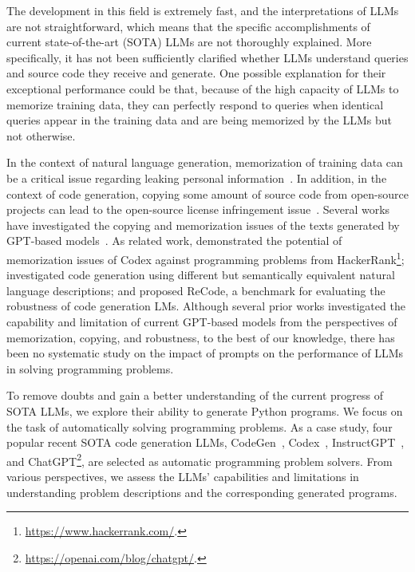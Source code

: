 \documentclass{article}
\begin{document}
The development in this field is extremely fast, and the interpretations of LLMs are not straightforward, which means that the specific accomplishments of current state-of-the-art (SOTA) LLMs are not thoroughly explained.
More specifically, it has not been sufficiently clarified whether LLMs understand queries and source code they receive and generate.
One possible explanation for their exceptional performance could be that, because of the high capacity of LLMs to memorize training data, they can perfectly respond to queries when identical queries appear in the training data and are being memorized by the LLMs but not otherwise.

In the context of natural language generation, memorization of training data can be a critical issue regarding leaking personal information~\citep{huang2022leaking}.
In addition, in the context of code generation, copying some amount of source code from open-source projects can lead to the open-source license infringement issue~\citep{ciniselli2022copy}.
Several works have investigated the copying and memorization issues of the texts generated by GPT-based models~\citep{carlini2021extract,elangovan2021memorization}.
As related work, \citet{karmakar2022hackerrank} demonstrated the potential of memorization issues of Codex against programming problems from HackerRank\footnote{\url{https://www.hackerrank.com/}.}; \citet{mastropaolo2023robustness} investigated code generation using different but semantically equivalent natural language descriptions; and \citet{wang2022recode} proposed ReCode, a benchmark for evaluating the robustness of code generation LMs.
Although several prior works investigated the capability and limitation of current GPT-based models from the perspectives of memorization, copying, and robustness, to the best of our knowledge, there has been no systematic study on the impact of prompts on the performance of LLMs in solving programming problems.

To remove doubts and gain a better understanding of the current progress of SOTA LLMs, we explore their ability to generate Python programs.
We focus on the task of automatically solving programming problems.
As a case study, four popular recent SOTA code generation LLMs, CodeGen~\citep{nijkamp2022codegen}, Codex~\citep{chen2021codex}, InstructGPT~\citep{ouyang2022instructgpt}, and ChatGPT\footnote{\url{https://openai.com/blog/chatgpt/}.}, are selected as automatic programming problem solvers.
From various perspectives, we assess the LLMs' capabilities and limitations in understanding problem descriptions and the corresponding generated programs.
\end{document}

